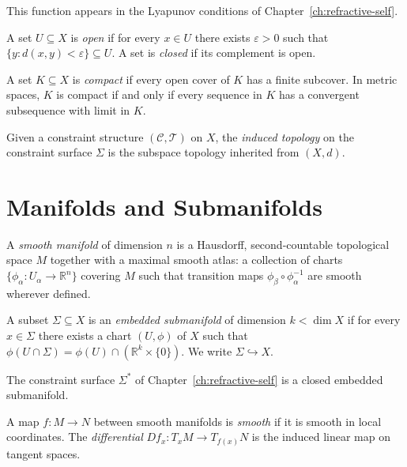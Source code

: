 \documentclass[11pt,openany]{book}
\begin{document}
This function appears in the Lyapunov conditions of
Chapter~\ref{ch:refractive-self}.

\begin{definition}
A set $U \subseteq X$ is \emph{open} if for every $x \in
U$ there exists $\varepsilon > 0$ such that
$\{y : d(x,y) < \varepsilon\} \subseteq U$.  A set is
\emph{closed} if its complement is open.
\end{definition}

\begin{definition}[Compactness]
A set $K \subseteq X$ is \emph{compact} if every open cover
of $K$ has a finite subcover.  In metric spaces, $K$ is
compact if and only if every sequence in $K$ has a
convergent subsequence with limit in $K$.
\end{definition}

\begin{definition}
Given a constraint structure $(\mathcal{C}, \mathcal{T})$
on $X$, the \emph{induced topology} on the constraint
surface $\Sigma$ is the subspace topology inherited from
$(X,d)$.
\end{definition}

\section{Manifolds and Submanifolds}
\label{sec:manifolds}

\begin{definition}
A \emph{smooth manifold} of dimension $n$ is a Hausdorff,
second-countable topological space $M$ together with a
maximal smooth atlas: a collection of charts
$\{\phi_\alpha : U_\alpha \to \mathbb{R}^n\}$ covering $M$
such that transition maps $\phi_\beta \circ \phi_\alpha^{-1}$
are smooth wherever defined.
\end{definition}

\begin{definition}
A subset $\Sigma \subseteq X$ is an \emph{embedded
submanifold} of dimension $k < \dim X$ if for every
$x \in \Sigma$ there exists a chart $(U, \phi)$ of $X$
such that $\phi(U \cap \Sigma) = \phi(U) \cap
(\mathbb{R}^k \times \{0\})$.  We write
$\Sigma \hookrightarrow X$.
\end{definition}

The constraint surface $\Sigma^*$ of
Chapter~\ref{ch:refractive-self} is a closed embedded
submanifold.

\begin{definition}
A map $f : M \to N$ between smooth manifolds is
\emph{smooth} if it is smooth in local coordinates.  The
\emph{differential} $Df_x : T_x M \to T_{f(x)} N$ is the
induced linear map on tangent spaces.
\end{definition}
\end{document}
